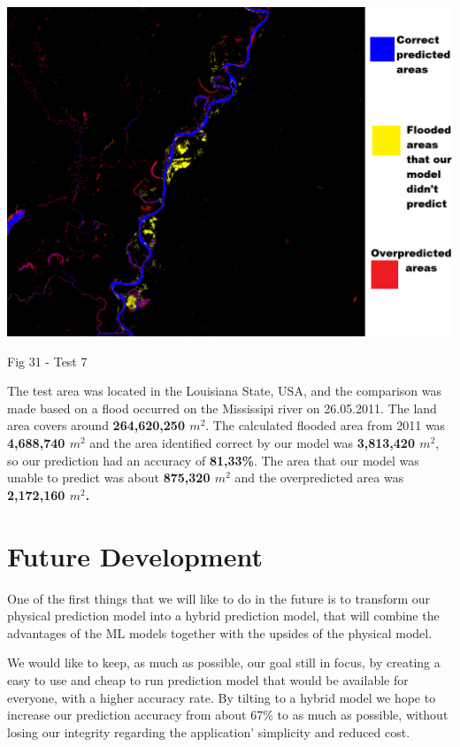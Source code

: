 \documentclass[12pt, a4paper]{report}
\begin{document}
\bigskip
\includegraphics[scale=0.5, center]{test_7.png}
\begin{center}
Fig 31 - Test 7
\end{center}
\par 

The test area was located in the Louisiana State, USA, and the comparison was made based on a flood occurred on the Mississipi river on 26.05.2011. The land area covers around \textbf{264,620,250 $m^2$}. The calculated flooded area from 2011 was \textbf{4,688,740 $m^2$} and the area identified correct by our model was \textbf{3,813,420 $m^2$}, so our prediction had an accuracy of \textbf{81,33\%}. The area that our model was unable to predict was about \textbf{875,320 $m^2$} and the overpredicted area was \textbf{2,172,160 $m^2$.}

\newpage

\section{Future Development}

\quad
One of the first things that we will like to do in the future is to transform our physical prediction model into a hybrid prediction model, that will combine the advantages of the ML models together with the upsides of the physical model.
\par 

We would like to keep, as much as possible, our goal still in focus, by creating a easy to use and cheap to run prediction model that would be available for everyone, with a higher accuracy rate. By tilting to a hybrid model we hope to increase our prediction accuracy from about 67\% to as much as possible, without losing our integrity regarding the application' simplicity and reduced cost.
\par
\end{document}
